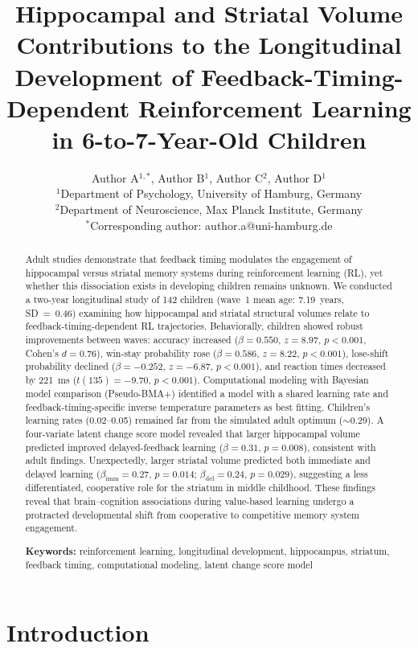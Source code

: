 \documentclass[11pt]{article}
\title{Hippocampal and Striatal Volume Contributions to the Longitudinal Development of Feedback-Timing-Dependent Reinforcement Learning in 6-to-7-Year-Old Children}
\author{%
  Author A$^{1,*}$, Author B$^{1}$, Author C$^{2}$, Author D$^{1}$ \\[6pt]
  $^{1}$Department of Psychology, University of Hamburg, Germany \\
  $^{2}$Department of Neuroscience, Max Planck Institute, Germany \\
  $^{*}$Corresponding author: author.a@uni-hamburg.de
}
\date{}
\begin{document}
\maketitle

\begin{abstract}
Adult studies demonstrate that feedback timing modulates the engagement of hippocampal versus striatal memory systems during reinforcement learning (RL), yet whether this dissociation exists in developing children remains unknown. We conducted a two-year longitudinal study of 142 children (wave~1 mean age: 7.19~years, SD~=~0.46) examining how hippocampal and striatal structural volumes relate to feedback-timing-dependent RL trajectories. Behaviorally, children showed robust improvements between waves: accuracy increased ($\beta = 0.550$, $z = 8.97$, $p < 0.001$, Cohen's $d = 0.76$), win-stay probability rose ($\beta = 0.586$, $z = 8.22$, $p < 0.001$), lose-shift probability declined ($\beta = -0.252$, $z = -6.87$, $p < 0.001$), and reaction times decreased by 221~ms ($t(135) = -9.70$, $p < 0.001$). Computational modeling with Bayesian model comparison (Pseudo-BMA$+$) identified a model with a shared learning rate and feedback-timing-specific inverse temperature parameters as best fitting. Children's learning rates (0.02--0.05) remained far from the simulated adult optimum ($\sim$0.29). A four-variate latent change score model revealed that larger hippocampal volume predicted improved delayed-feedback learning ($\beta = 0.31$, $p = 0.008$), consistent with adult findings. Unexpectedly, larger striatal volume predicted both immediate and delayed learning ($\beta_{\text{imm}} = 0.27$, $p = 0.014$; $\beta_{\text{del}} = 0.24$, $p = 0.029$), suggesting a less differentiated, cooperative role for the striatum in middle childhood. These findings reveal that brain--cognition associations during value-based learning undergo a protracted developmental shift from cooperative to competitive memory system engagement.

\medskip
\noindent\textbf{Keywords:} reinforcement learning, longitudinal development, hippocampus, striatum, feedback timing, computational modeling, latent change score model
\end{abstract}

\section{Introduction}
\end{document}
